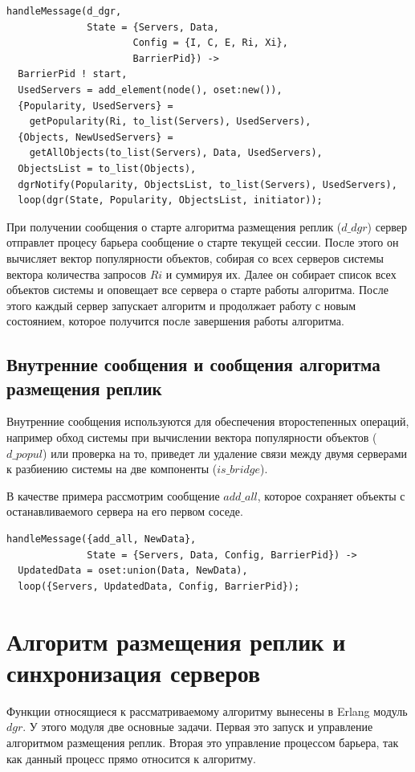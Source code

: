 			\begin{lstlisting}
handleMessage(d_dgr, 
              State = {Servers, Data, 
                      Config = {I, C, E, Ri, Xi}, 
                      BarrierPid}) ->
  BarrierPid ! start,
  UsedServers = add_element(node(), oset:new()),
  {Popularity, UsedServers} = 
    getPopularity(Ri, to_list(Servers), UsedServers),
  {Objects, NewUsedServers} = 
    getAllObjects(to_list(Servers), Data, UsedServers),
  ObjectsList = to_list(Objects),
  dgrNotify(Popularity, ObjectsList, to_list(Servers), UsedServers),
  loop(dgr(State, Popularity, ObjectsList, initiator));				
			\end{lstlisting}
			При получении сообщения о старте алгоритма размещения реплик ($d\_dgr$) сервер отправлет процесу барьера сообщение о старте текущей сессии. После этого он вычисляет вектор 
			популярности объектов, собирая со всех серверов системы вектора количества запросов $Ri$ и суммируя их. Далее он собирает список всех объектов системы и оповещает все сервера о старте 
			работы алгоритма. После этого каждый сервер запускает алгоритм и продолжает работу с новым состоянием, которое получится после завершения работы алгоритма.		
			
		\subsection{Внутренние сообщения и сообщения алгоритма размещения реплик}
			Внутренние сообщения используются для обеспечения второстепенных операций, например обход системы при вычислении вектора популярности объектов ($d\_popul$) или проверка на то,
			приведет ли удаление связи между двумя серверами к разбиению системы на две компоненты ($is\_bridge$).

			В качестве примера рассмотрим сообщение $add\_all$, которое сохраняет объекты с останавливаемого сервера на его первом соседе.
			\begin{lstlisting}
handleMessage({add_all, NewData}, 
              State = {Servers, Data, Config, BarrierPid}) ->
  UpdatedData = oset:union(Data, NewData),
  loop({Servers, UpdatedData, Config, BarrierPid});		
			\end{lstlisting}

	\section{Алгоритм размещения реплик и синхронизация серверов}
		Функции относящиеся к рассматриваемому алгоритму вынесены в Erlang модуль $dgr$. У этого модуля две основные задачи. Первая это запуск и управление алгоритмом размещения реплик.
		Вторая это управление процессом барьера, так как данный процесс прямо относится к алгоритму.

